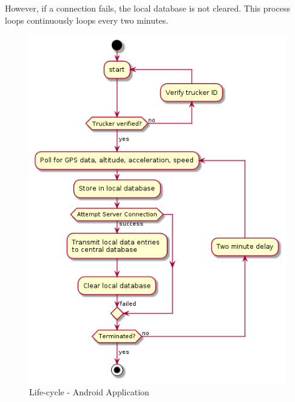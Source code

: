 However, if a connection fails, the local database is not cleared.
This process loops continuously loops every two minutes.
 
\begin{figure}[H]
\centering
\includegraphics[scale=0.6]{android_activity.png}
\caption{Life-cycle - Android Application}
\label{fig:android_activity}
\end{figure}

